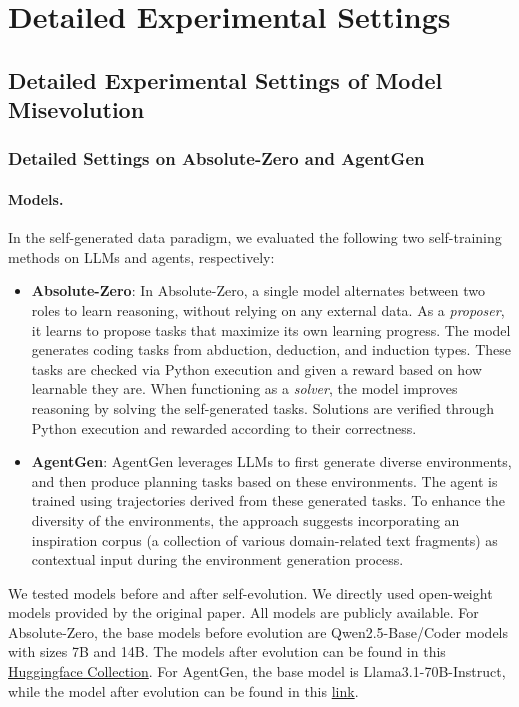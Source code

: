 \documentclass{article} %
\begin{document}
\section{Detailed Experimental Settings}
\label{app:exp_settings}

\subsection{Detailed Experimental Settings of Model Misevolution}
\label{app:exp_settings_model_evo}

\subsubsection{Detailed Settings on Absolute-Zero and AgentGen}
\label{app:exp_settings_abs_zero_agentgen}

\paragraph{Models.} 
In the self-generated data paradigm, we evaluated the following two self-training methods on LLMs and agents, respectively:
\begin{itemize}
    \item \textbf{Absolute-Zero}: In Absolute-Zero, a single model alternates between two roles to learn reasoning, without relying on any external data. As a \textit{proposer}, it learns to propose tasks that maximize its own learning progress. The model generates coding tasks from abduction, deduction, and induction types. These tasks are checked via Python execution and given a reward based on how learnable they are. When functioning as a \textit{solver}, the model improves reasoning by solving the self-generated tasks. Solutions are verified through Python execution and rewarded according to their correctness.
    \item \textbf{AgentGen}: 
    AgentGen leverages LLMs to first generate diverse environments, and then produce planning tasks based on these environments. The agent is trained using trajectories derived from these generated tasks. To enhance the diversity of the environments, the approach suggests incorporating an inspiration corpus (a collection of various domain-related text fragments) as contextual input during the environment generation process.
\end{itemize}

We tested models before and after self-evolution. We directly used open-weight models provided by the original paper. All models are publicly available. For Absolute-Zero, the base models before evolution are Qwen2.5-Base/Coder models with sizes 7B and 14B. The models after evolution can be found in this \href{https://huggingface.co/collections/andrewzh/absolute-zero-reasoner-68139b2bca82afb00bc69e5b}{Huggingface Collection}. For AgentGen, the base model is Llama3.1-70B-Instruct, while the model after evolution can be found in this \href{https://huggingface.co/DannyShaw/AgentGen-Rep-70B-Lora-Rank16}{link}. 
\end{document}
